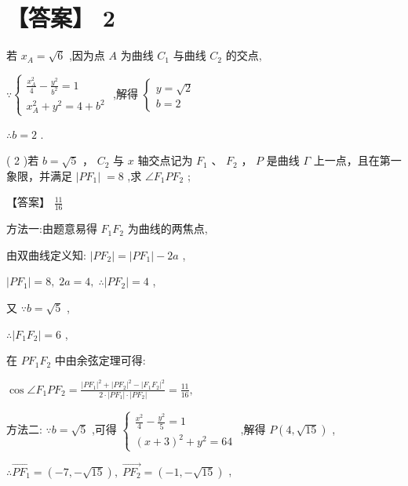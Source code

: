 \documentclass[10pt]{article}
\begin{document}
\section*{【答案】 2}

若 \({x}_{A} = \sqrt{6}\) ,因为点 \(A\) 为曲线 \({C}_{1}\) 与曲线 \({C}_{2}\) 的交点,

\(\because \left\{  \begin{array}{l} \frac{{x}_{A}^{2}}{4} - \frac{{y}^{2}}{{b}^{2}} = 1 \\  {x}_{A}^{2} + {y}^{2} = 4 + {b}^{2} \end{array}\right.\) ,解得 \(\left\{  \begin{array}{l} y = \sqrt{2} \\  b = 2 \end{array}\right.\)

\(\therefore b = 2\) .

( 2 )若 \(b = \sqrt{5}\) ， \({C}_{2}\) 与 \(x\) 轴交点记为 \({F}_{1}\) 、 \({F}_{2}\) ， \(P\) 是曲线 \(\Gamma\) 上一点，且在第一象限，并满足 \(\left| {P{F}_{1}}\right| \; = 8\) ,求 \(\angle {F}_{1}P{F}_{2}\) ;

【答案】 \(\frac{11}{16}\)

方法一:由题意易得 \({F}_{1}{F}_{2}\) 为曲线的两焦点,

由双曲线定义知: \(\left| {P{F}_{2}}\right|  = \left| {P{F}_{1}}\right|  - {2a}\) ,

\(\left| {P{F}_{1}}\right|  = 8,\;{2a} = 4,\;\therefore \left| {P{F}_{2}}\right|  = 4\) ,

又 \(\because b = \sqrt{5}\) ,

\(\therefore \left| {{F}_{1}{F}_{2}}\right|  = 6\) ,

在 \(P{F}_{1}{F}_{2}\) 中由余弦定理可得:

\(\cos \angle {F}_{1}P{F}_{2} = \frac{{\left| P{F}_{1}\right| }^{2} + {\left| P{F}_{2}\right| }^{2} - {\left| {F}_{1}{F}_{2}\right| }^{2}}{2 \cdot  \left| {P{F}_{1}}\right|  \cdot  \left| {P{F}_{2}}\right| } = \frac{11}{16},\)

方法二: \(\because b = \sqrt{5}\) ,可得 \(\left\{  \begin{array}{l} \frac{{x}^{2}}{4} - \frac{{y}^{2}}{5} = 1 \\  {\left( x + 3\right) }^{2} + {y}^{2} = {64} \end{array}\right.\) ,解得 \(P\left( {4,\sqrt{15}}\right)\) ,

\(\therefore \overrightarrow{P{F}_{1}} = \left( {-7, - \sqrt{15}}\right) ,\;\overrightarrow{P{F}_{2}} = \left( {-1, - \sqrt{15}}\right)\) ,
\end{document}
